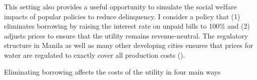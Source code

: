 \documentclass[12pt]{article}
\begin{document}

This setting also provides a useful opportunity to simulate the social welfare impacts of popular policies to reduce delinquency.  I consider a policy that (1) eliminates borrowing by raising the interest rate on unpaid bills to 100\% and (2) adjusts prices to ensure that the utility remains revenue-neutral.  The regulatory structure in Manila as well as many other developing cities ensures that prices for water are regulated to exactly cover all production costs (\cite{hoque2013state}).

Eliminating borrowing affects the costs of the utility in four main ways
\end{document}
